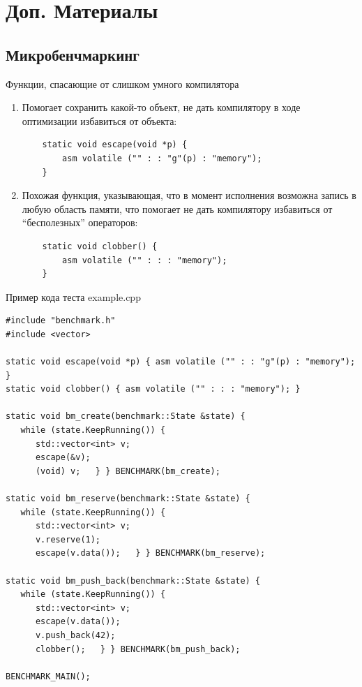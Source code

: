 \section{Доп. Материалы}
\subsection{Микробенчмаркинг}

\begin{frame}[fragile]{Функции, спасающие от слишком умного компилятора}
	\begin{enumerate}
		\item Помогает сохранить какой-то объект, не дать компилятору в ходе оптимизации избавиться от объекта:
\begin{lstlisting}
    static void escape(void *p) {
        asm volatile ("" : : "g"(p) : "memory");
    }
\end{lstlisting}

		\item Похожая функция, указывающая, что в момент исполнения возможна запись в любую область памяти, что помогает не дать компилятору избавиться от \enquote{бесполезных} операторов:
\begin{lstlisting}
    static void clobber() {
        asm volatile ("" : : : "memory");
    }
\end{lstlisting}

	\end{enumerate}
\end{frame}

\begin{frame}[fragile]{Пример кода теста example.cpp}
	\tiny
\begin{lstlisting}
#include "benchmark.h"
#include <vector>

static void escape(void *p) { asm volatile ("" : : "g"(p) : "memory"); }
static void clobber() { asm volatile ("" : : : "memory"); }

static void bm_create(benchmark::State &state) {
   while (state.KeepRunning()) {
      std::vector<int> v;
      escape(&v);   
      (void) v;   } } BENCHMARK(bm_create);

static void bm_reserve(benchmark::State &state) {
   while (state.KeepRunning()) {
      std::vector<int> v;
      v.reserve(1);
      escape(v.data());   } } BENCHMARK(bm_reserve);

static void bm_push_back(benchmark::State &state) {
   while (state.KeepRunning()) {
      std::vector<int> v;
      escape(v.data());
      v.push_back(42);
      clobber();   } } BENCHMARK(bm_push_back);

BENCHMARK_MAIN();
\end{lstlisting}
\end{frame}

